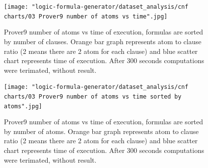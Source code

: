 \begin{figure}[h]
  \centering
  \texttt{[image: "logic-formula-generator/dataset\_analysis/cnf charts/03 Prover9 number of atoms vs time".jpg]}
  \caption{Prover9 number of atoms vs time of execution, formulas are sorted by number of clauses. Orange bar graph represents atom to clause ratio (2 means there are 2 atom for each clause) and blue scatter chart represents time of execution. After 300 seconds computations were terimated, without result.}
  \label{pic:Prover9NumberOfAtomsVsTime}
\end{figure}

\begin{figure}[h]
  \centering
  \texttt{[image: "logic-formula-generator/dataset\_analysis/cnf charts/03 Prover9 number of atoms vs time sorted by atoms".jpg]}
  \caption{Prover9 number of atoms vs time of execution, formulas are sorted by number of atoms. Orange bar graph represents atom to clause ratio (2 means there are 2 atom for each clause) and blue scatter chart represents time of execution. After 300 seconds computations were terimated, without result.}
  \label{pic:Prover9NumberOfAtomsVsTimeSortedByAtoms}
\end{figure}
